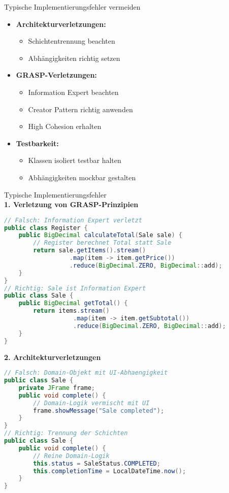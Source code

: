 \begin{KR}{Typische Implementierungsfehler vermeiden}
\begin{itemize}
    \item \textbf{Architekturverletzungen:}
    \begin{itemize}
        \item Schichtentrennung beachten
        \item Abhängigkeiten richtig setzen
    \end{itemize}
    
    \item \textbf{GRASP-Verletzungen:}
    \begin{itemize}
        \item Information Expert beachten
        \item Creator Pattern richtig anwenden
        \item High Cohesion erhalten
    \end{itemize}
    
    \item \textbf{Testbarkeit:}
    \begin{itemize}
        \item Klassen isoliert testbar halten
        \item Abhängigkeiten mockbar gestalten
    \end{itemize}
\end{itemize}
\end{KR}

\begin{example2}{Typische Implementierungsfehler}\\
\textbf{1. Verletzung von GRASP-Prinzipien}
\begin{lstlisting}[language=Java, style=basesmol]
// Falsch: Information Expert verletzt
public class Register {
    public BigDecimal calculateTotal(Sale sale) {
        // Register berechnet Total statt Sale
        return sale.getItems().stream()
                  .map(item -> item.getPrice())
                  .reduce(BigDecimal.ZERO, BigDecimal::add);
    }
}
// Richtig: Sale ist Information Expert
public class Sale {
    public BigDecimal getTotal() {
        return items.stream()
                   .map(item -> item.getSubtotal())
                   .reduce(BigDecimal.ZERO, BigDecimal::add);
    }
}
\end{lstlisting}

\textbf{2. Architekturverletzungen}
\begin{lstlisting}[language=Java, style=basesmol]
// Falsch: Domain-Objekt mit UI-Abhaengigkeit
public class Sale {
    private JFrame frame;
    public void complete() {
        // Domain-Logik vermischt mit UI
        frame.showMessage("Sale completed");
    }
}
// Richtig: Trennung der Schichten
public class Sale {
    public void complete() {
        // Reine Domain-Logik
        this.status = SaleStatus.COMPLETED;
        this.completionTime = LocalDateTime.now();
    }
}
\end{lstlisting}
\end{example2}

